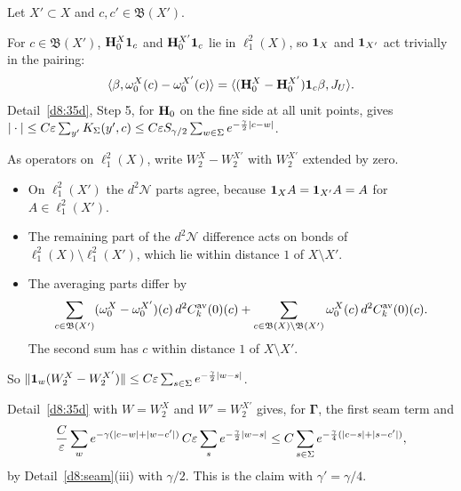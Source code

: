 \begin{detail}\label{d8:ix11}
Let $X'\subset X$ and $c,c'\in\mathfrak B(X')$.
\begin{step}[$\omega_0$]
For $c\in\mathfrak B(X')$, $\mathbf H^X_0\mathbf 1_c$ and $\mathbf H^{X'}_0\mathbf 1_c$ lie in $\ell^2_1(X)$, so $\mathbf 1_X$ and $\mathbf 1_{X'}$ act trivially in the pairing:
\[
\langle \beta,\omega_0^X(c)-\omega_0^{X'}(c)\rangle=\langle (\mathbf H_0^X-\mathbf H_0^{X'})\mathbf 1_c\beta,J_U\rangle.
\]
Detail~\ref{d8:35d}, Step 5, for $\mathbf H_0$ on the fine side at all unit points, gives $|\cdot|\le C\varepsilon\sum_{y'}K_\Sigma(y',c)\le C\varepsilon S_{\gamma/2}\sum_{w\in\Sigma}e^{-\frac\gamma2|c-w|}$.
\end{step}
\begin{step}[$W_2$]
As operators on $\ell^2_1(X)$, write $W_2^X-W_2^{X'}$ with $W_2^{X'}$ extended by zero.
\begin{itemize}
\item On $\ell^2_1(X')$ the $d^2\mathcal N$ parts agree, because $\mathbf 1_XA=\mathbf 1_{X'}A=A$ for $A\in\ell^2_1(X')$.
\item The remaining part of the $d^2\mathcal N$ difference acts on bonds of $\ell^2_1(X)\setminus\ell^2_1(X')$, which lie within distance $1$ of $X\setminus X'$.
\item The averaging parts differ by
\[
\sum_{c\in\mathfrak B(X')}(\omega_0^X-\omega_0^{X'})(c)\,d^2C^{\rm av}_k(0)(c)+\sum_{c\in\mathfrak B(X)\setminus\mathfrak B(X')}\omega_0^X(c)\,d^2C^{\rm av}_k(0)(c).
\]
The second sum has $c$ within distance $1$ of $X\setminus X'$.
\end{itemize}
So $\|\mathbf 1_w(W_2^X-W_2^{X'})\|\le C\varepsilon\sum_{s\in\Sigma}e^{-\frac\gamma2|w-s|}$.
\end{step}
\begin{step}[$\Delta^0$]
Detail~\ref{d8:35d} with $W=W_2^X$ and $W'=W_2^{X'}$ gives, for $\boldsymbol\Gamma$, the first seam term and
\[
\frac C{\varepsilon}\sum_we^{-\gamma(|c-w|+|w-c'|)}\,C\varepsilon\sum_se^{-\frac\gamma2|w-s|}\le C\sum_{s\in\Sigma}e^{-\frac\gamma4(|c-s|+|s-c'|)},
\]
by Detail~\ref{d8:seam}(iii) with $\gamma/2$. This is the claim with $\gamma'=\gamma/4$.
\end{step}
\end{detail}

